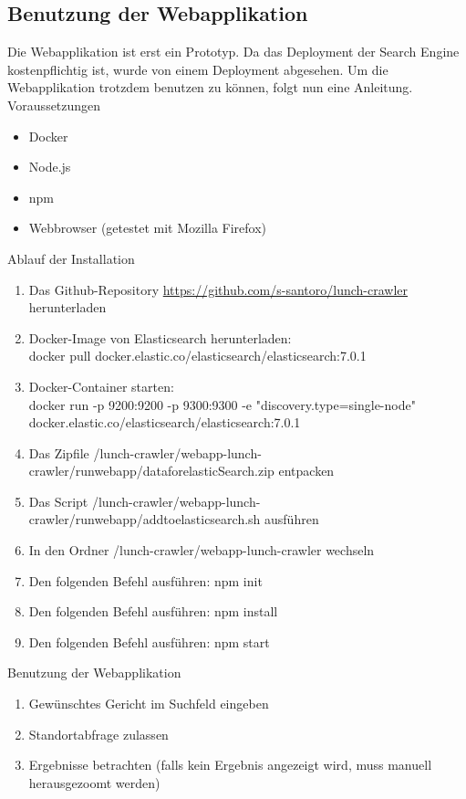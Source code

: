 \subsection{Benutzung der Webapplikation}
Die Webapplikation ist erst ein Prototyp.
Da das Deployment der Search Engine kostenpflichtig ist, wurde von einem Deployment abgesehen.
Um die Webapplikation trotzdem benutzen zu können, folgt nun eine Anleitung.\\

Voraussetzungen
\begin{itemize}
	\item Docker
	\item Node.js
	\item npm
	\item Webbrowser (getestet mit Mozilla Firefox)
\end{itemize}
Ablauf der Installation
\begin{enumerate}
	\item Das Github-Repository \url{https://github.com/s-santoro/lunch-crawler} herunterladen
	\item Docker-Image von Elasticsearch herunterladen:\\
	docker pull docker.elastic.co/elasticsearch/elasticsearch:7.0.1
	\item Docker-Container starten:\\
	docker run -p 9200:9200 -p 9300:9300 -e "discovery.type=single-node" \\ docker.elastic.co/elasticsearch/elasticsearch:7.0.1
	\item Das Zipfile \glqq/lunch-crawler/webapp-lunch-crawler/run\textunderscore webapp/data\textunderscore for\textunderscore elasticSearch.zip\grqq{} entpacken
	\item Das Script \glqq/lunch-crawler/webapp-lunch-crawler/run\textunderscore webapp/add\textunderscore to\textunderscore elasticsearch.sh\grqq{} ausführen
	\item In den Ordner \glqq/lunch-crawler/webapp-lunch-crawler\grqq{} wechseln
	\item Den folgenden Befehl ausführen: npm init
	\item Den folgenden Befehl ausführen: npm install
	\item Den folgenden Befehl ausführen: npm start
\end{enumerate}
Benutzung der Webapplikation
\begin{enumerate}
	\item Gewünschtes Gericht im Suchfeld eingeben
	\item Standortabfrage zulassen
	\item Ergebnisse betrachten (falls kein Ergebnis angezeigt wird, muss manuell herausgezoomt werden)
\end{enumerate}
